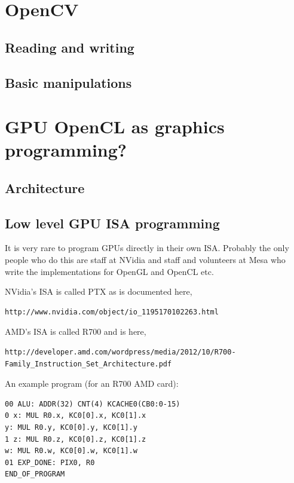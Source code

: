 \documentclass[oneside,english]{scrbook}
\begin{document}
\chapter{OpenCV}


\section{Reading and writing}




\section{Basic manipulations}



\chapter{GPU OpenCL as graphics programming?}

\section{Architecture}

\section{Low level GPU ISA programming}

It is very rare to program GPUs directly in their own ISA.  Probably the only people who do this are staff at NVidia and staff and volunteers at Mesa who write the implementations for OpenGL and OpenCL etc.

NVidia's ISA is called PTX as is documented here,
\begin{lstlisting}
http://www.nvidia.com/object/io_1195170102263.html
\end{lstlisting}

AMD's ISA is called R700 and is here,
\begin{lstlisting}
http://developer.amd.com/wordpress/media/2012/10/R700-Family_Instruction_Set_Architecture.pdf
\end{lstlisting}

An example program (for an R700 AMD card):

\begin{lstlisting}
00 ALU: ADDR(32) CNT(4) KCACHE0(CB0:0-15)   
0 x: MUL R0.x, KC0[0].x, KC0[1].x    
y: MUL R0.y, KC0[0].y, KC0[1].y
1 z: MUL R0.z, KC0[0].z, KC0[1].z
w: MUL R0.w, KC0[0].w, KC0[1].w
01 EXP_DONE: PIX0, R0
END_OF_PROGRAM
\end{lstlisting}
\end{document}
